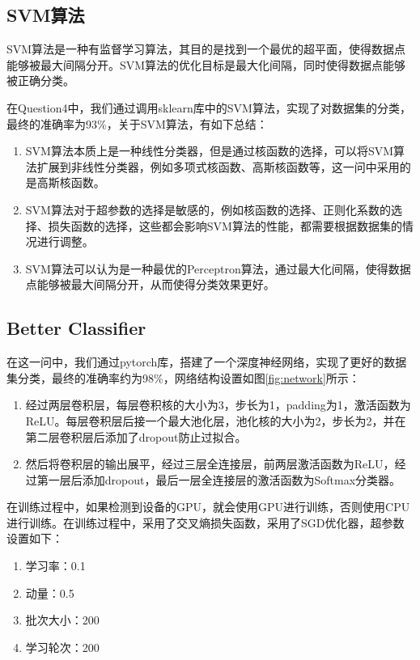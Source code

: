\documentclass[UTF8]{ctexart}
\begin{document}
\subsection{SVM算法}

\indent SVM算法是一种有监督学习算法，其目的是找到一个最优的超平面，使得数据点能够被最大间隔分开。SVM算法的优化目标是最大化间隔，同时使得数据点能够被正确分类。

\indent 在Question4中，我们通过调用sklearn库中的SVM算法，实现了对数据集的分类，最终的准确率为93\%，关于SVM算法，有如下总结：

\begin{enumerate}
    \item SVM算法本质上是一种线性分类器，但是通过核函数的选择，可以将SVM算法扩展到非线性分类器，例如多项式核函数、高斯核函数等，这一问中采用的是高斯核函数。
    \item SVM算法对于超参数的选择是敏感的，例如核函数的选择、正则化系数的选择、损失函数的选择，这些都会影响SVM算法的性能，都需要根据数据集的情况进行调整。
    \item SVM算法可以认为是一种最优的Perceptron算法，通过最大化间隔，使得数据点能够被最大间隔分开，从而使得分类效果更好。
\end{enumerate}

\subsection{Better Classifier}

\indent 在这一问中，我们通过pytorch库，搭建了一个深度神经网络，实现了更好的数据集分类，最终的准确率约为98\%，网络结构设置如图\ref{fig:network}所示：

\begin{enumerate}
    \item 经过两层卷积层，每层卷积核的大小为3，步长为1，padding为1，激活函数为ReLU。每层卷积层后接一个最大池化层，池化核的大小为2，步长为2，并在第二层卷积层后添加了dropout防止过拟合。
    \item 然后将卷积层的输出展平，经过三层全连接层，前两层激活函数为ReLU，经过第一层后添加dropout，最后一层全连接层的激活函数为Softmax分类器。
\end{enumerate}

\indent 在训练过程中，如果检测到设备的GPU，就会使用GPU进行训练，否则使用CPU进行训练。在训练过程中，采用了交叉熵损失函数，采用了SGD优化器，超参数设置如下：

\begin{enumerate}
    \item 学习率：0.1
    \item 动量：0.5
    \item 批次大小：200
    \item 学习轮次：200
\end{enumerate}
\end{document}
